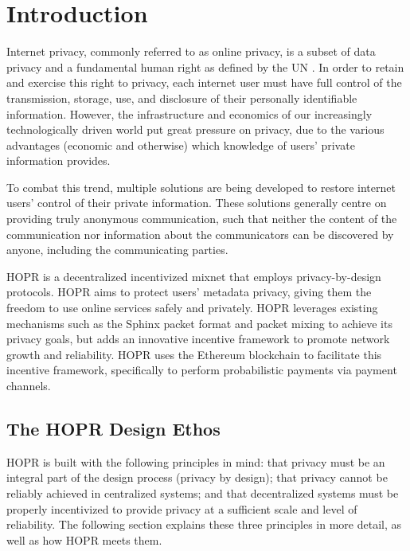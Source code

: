 
\section{Introduction}
\label{sec:introduction}

Internet privacy, commonly referred to as online privacy, is a subset of data privacy and a fundamental human right as defined by the UN \cite{un2018}. In order to retain and exercise this right to privacy, each internet user must have full control of the transmission, storage, use, and disclosure of their personally identifiable information. However, the infrastructure and economics of our increasingly technologically driven world put great pressure on privacy, due to the various advantages (economic and otherwise) which knowledge of users' private information provides.

To combat this trend, multiple solutions are being developed to restore internet users' control of their private information. These solutions generally centre on providing truly anonymous communication, such that neither the content of the communication nor information about the communicators can be discovered by anyone, including the communicating parties.

HOPR is a decentralized incentivized mixnet that employs privacy-by-design protocols. HOPR aims to protect users' metadata privacy, giving them the freedom to use online services safely and privately. HOPR leverages existing mechanisms such as the Sphinx packet format \cite{sphinxpaper} and packet mixing to achieve its privacy goals, but adds an innovative incentive framework to promote network growth and reliability. HOPR uses the Ethereum blockchain \cite{ethereum} to facilitate this incentive framework, specifically to perform probabilistic payments via payment channels.


\subsection{The HOPR Design Ethos}
\label{sec:vision}

HOPR is built with the following principles in mind: that privacy must be an integral part of the design process (privacy by design); that privacy cannot be reliably achieved in centralized systems; and that decentralized systems must be properly incentivized to provide privacy at a sufficient scale and level of reliability. The following section explains these three principles in more detail, as well as how HOPR meets them.

